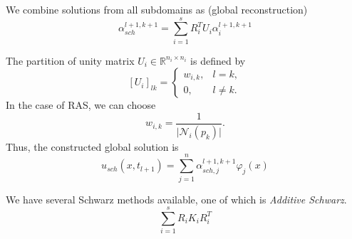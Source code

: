\documentclass[a4paper, 11pt]{article}
\theoremstyle{plain}
\theoremstyle{definition}
\theoremstyle{remark}
\begin{document}
We combine solutions from all subdomains as (global reconstruction)
\begin{equation*}
    \alpha_{sch}^{l+1, k+1} = \sum_{i = 1}^{s}R_{i}^{T}U_{i}\alpha^{l+1, k + 1}_{i}
\end{equation*}

The partition of unity matrix $U_{i}\in \mathbb{R}^{n_{i}\times n_{i}}$ is defined by
\begin{equation*}
    \left[U_{i}\right]_{lk} = 
    \begin{cases}
        w_{i, k}, & l=k,\\
        0, & l\neq k.
    \end{cases}
\end{equation*}
In the case of RAS, we can choose
\begin{equation*}
    w_{i, k} = \dfrac{1}{\lvert \mathcal{N}_{i}(p_{k})\rvert}.
\end{equation*}
Thus, the constructed global solution is
\begin{equation*}
    u_{sch}(x, t_{l+1}) = \sum_{j=1}^{n}\alpha_{sch, j}^{l+1, k+1}\varphi_{j}(x)
\end{equation*}


We have several Schwarz methods available, one of which is \textit{Additive Schwarz}.
\begin{equation*}
    \sum_{i = 1}^{s}R_{i}K_{i}R_{i}^{T}
\end{equation*}
\end{document}
